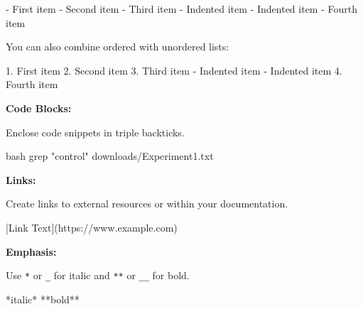 \documentclass[
  letterpaper,
  DIV=11,
  numbers=noendperiod]{scrreprt}
\newenvironment{Shaded}{}{}
\newcommand{\CommentTok}[1]{\textcolor[rgb]{0.42,0.45,0.49}{#1}}
\newcommand{\FunctionTok}[1]{\textcolor[rgb]{0.44,0.26,0.76}{#1}}
\newcommand{\InformationTok}[1]{\textcolor[rgb]{0.42,0.45,0.49}{#1}}
\newcommand{\NormalTok}[1]{\textcolor[rgb]{0.14,0.16,0.18}{#1}}
\newcommand{\OtherTok}[1]{\textcolor[rgb]{0.44,0.26,0.76}{#1}}
\newcommand{\SpecialStringTok}[1]{\textcolor[rgb]{0.01,0.18,0.38}{#1}}
\newcommand{\StringTok}[1]{\textcolor[rgb]{0.01,0.18,0.38}{#1}}
\begin{document}
\begin{Shaded}
\begin{Highlighting}[]
\SpecialStringTok{ {-} }\NormalTok{First item}
\SpecialStringTok{{-} }\NormalTok{Second item}
\SpecialStringTok{{-} }\NormalTok{Third item}
\SpecialStringTok{    {-} }\NormalTok{Indented item}
\SpecialStringTok{    {-} }\NormalTok{Indented item}
\SpecialStringTok{{-} }\NormalTok{Fourth item }
\end{Highlighting}
\end{Shaded}

You can also combine ordered with unordered lists:

\begin{Shaded}
\begin{Highlighting}[]
\SpecialStringTok{1. }\NormalTok{First item}
\SpecialStringTok{2. }\NormalTok{Second item}
\SpecialStringTok{3. }\NormalTok{Third item}
\SpecialStringTok{    {-} }\NormalTok{Indented item}
\SpecialStringTok{    {-} }\NormalTok{Indented item}
\SpecialStringTok{4. }\NormalTok{Fourth item}
\end{Highlighting}
\end{Shaded}

\textbf{Code Blocks:}

Enclose code snippets in triple backticks.

\begin{Shaded}
\begin{Highlighting}[]
\InformationTok{\textasciigrave{}\textasciigrave{}\textasciigrave{}bash}
\FunctionTok{grep} \StringTok{"control"}\NormalTok{ downloads/Experiment1.txt}
\InformationTok{\textasciigrave{}\textasciigrave{}\textasciigrave{}}
\end{Highlighting}
\end{Shaded}

\textbf{Links:}

Create links to external resources or within your documentation.

\begin{Shaded}
\begin{Highlighting}[]
\CommentTok{[}\OtherTok{Link Text}\CommentTok{](https://www.example.com)}
\end{Highlighting}
\end{Shaded}

\textbf{Emphasis:}

Use \texttt{*} or \texttt{\_} for italic and \texttt{**} or
\texttt{\_\_} for bold.

\begin{Shaded}
\begin{Highlighting}[]
\NormalTok{*italic*}
\NormalTok{**bold**}
\end{Highlighting}
\end{Shaded}
\end{document}
